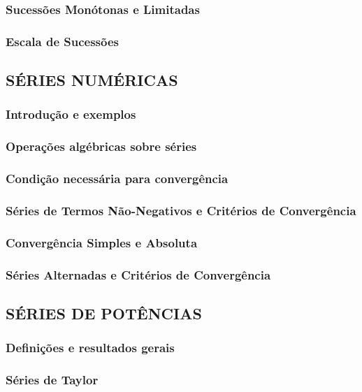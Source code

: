 \documentclass[11pt]{article}
\begin{document}
\subsubsection{Sucessões Monótonas e Limitadas}

\subsubsection{Escala de Sucessões}

\subsection{\MakeUppercase{Séries Numéricas}}

\subsubsection{Introdução e exemplos}

\subsubsection{Operações algébricas sobre séries}

\subsubsection{Condição necessária para convergência}

\subsubsection{Séries de Termos Não-Negativos e Critérios de Convergência}

\subsubsection{Convergência Simples e Absoluta}

\subsubsection{Séries Alternadas e Critérios de Convergência}

\subsection{\MakeUppercase{Séries de Potências}}

\subsubsection{Definições e resultados gerais}

\subsubsection{Séries de Taylor}
\end{document}

